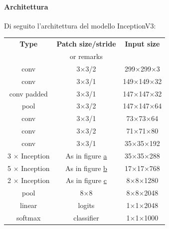         \paragraph{Architettura}
        Di seguito l'architettura del modello InceptionV3:
            \begin{table}[!h]
                \centering
                \begin{tabular}{|c|c|c|}
                    \hline
                    \rule[-3mm]{0mm}{8mm}
                    \textbf{Type} & \textbf{Patch size/stride} & \textbf{Input size}\\
                    & or remarks &\\
                    \hline \hline
                    \rule[-3mm]{0mm}{8mm}
                    conv & 3$\times$3/2 & 299$\times$299$\times$3\\
                    \hline
                    \rule[-3mm]{0mm}{8mm}
                    conv & 3$\times$3/1 & 149$\times$149$\times$32\\
                    \hline
                    \rule[-3mm]{0mm}{8mm}
                    conv padded & 3$\times$3/1 & 147$\times$147$\times$32\\
                    \hline
                    \rule[-3mm]{0mm}{8mm}
                    pool & 3$\times$3/2 & 147$\times$147$\times$64\\
                    \hline
                    \rule[-3mm]{0mm}{8mm}
                    conv & 3$\times$3/1 & 73$\times$73$\times$64\\
                    \hline
                    \rule[-3mm]{0mm}{8mm}
                    conv & 3$\times$3/2 & 71$\times$71$\times$80\\
                    \hline
                    \rule[-3mm]{0mm}{8mm}
                    conv & 3$\times$3/1 & 35$\times$35$\times$192\\
                    \hline
                    \rule[-3mm]{0mm}{8mm}
                    3 $\times$ Inception & As in figure \hyperref[InceptionV3_5]{a} & 35$\times$35$\times$288\\
                    \hline
                    \rule[-3mm]{0mm}{8mm}
                    5 $\times$ Inception & As in figure \hyperref[InceptionV3_6]{b} & 17$\times$17$\times$768\\
                    \hline
                    \rule[-3mm]{0mm}{8mm}
                    2 $\times$ Inception & As in figure \hyperref[InceptionV3_7]{c} & 8$\times$8$\times$1280\\
                    \hline
                    \rule[-3mm]{0mm}{8mm}
                    pool & 8$\times$8 & 8$\times$8$\times$2048\\
                    \hline
                    \rule[-3mm]{0mm}{8mm}
                    linear & logits & 1$\times$1$\times$2048\\
                    \hline
                    \rule[-3mm]{0mm}{8mm}
                    softmax & classifier & 1$\times$1$\times$1000\\
                    \hline
                \end{tabular}
                \label{InceptionV3 Architecture}
            \end{table}

